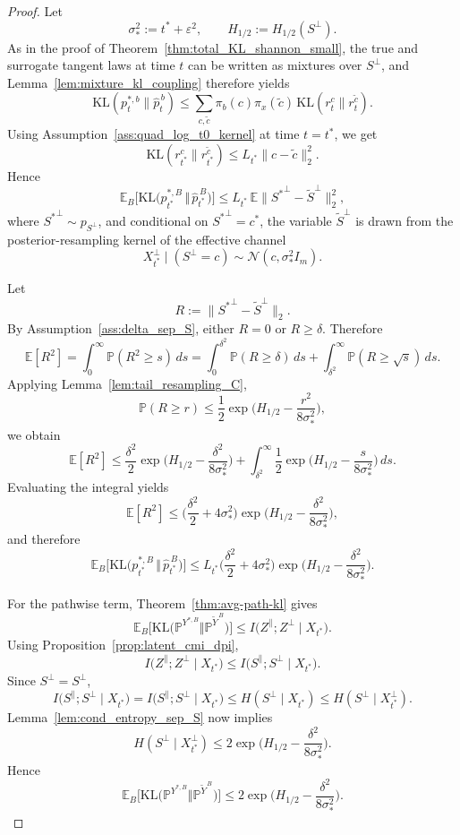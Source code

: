 \documentclass[twoside,11pt]{article}
\newcommand{\E}{\mathbb{E}}
\newcommand{\PP}{\mathbb{P}}
\newcommand{\Nc}{\mathcal{N}}
\newcommand{\KL}{\mathrm{KL}}
\numberwithin{equation}{section}
\begin{document}
\begin{proof}
Let
\[
\sigma_*^2:=t^*+\varepsilon^2,
\qquad
H_{1/2}:=H_{1/2}(S^\perp).
\]
As in the proof of Theorem~\ref{thm:total_KL_shannon_small}, the true and surrogate tangent
laws at time \(t\) can be written as mixtures over \(S^\perp\), and Lemma~\ref{lem:mixture_kl_coupling}
therefore yields
\[
\KL(p_t^{*,b}\|\hat p_t^{\,b})
\le
\sum_{c,\tilde c}\pi_b(c)\pi_x(\tilde c)\,\KL(r_t^c\|r_t^{\tilde c}).
\]
Using Assumption~\ref{ass:quad_log_t0_kernel} at time \(t=t^*\), we get
\[
\KL(r_{t^*}^c\|r_{t^*}^{\tilde c})
\le
L_{t^*}\|c-\tilde c\|_2^2.
\]
Hence
\[
\E_B\!\Big[\KL\!\big(p_{t^*}^{*,B}\,\Vert\,\hat p_{t^*}^{\,B}\big)\Big]
\le
L_{t^*}\,\E\|{S^*}^{\perp}-\tilde S^\perp\|_2^2,
\]
where \({S^*}^{\perp}\sim p_{S^\perp}\), and conditional on \({S^*}^{\perp}=c^*\), the variable
\(\tilde S^\perp\) is drawn from the posterior-resampling kernel of the effective channel
\[
X_{t^*}^\perp\mid(S^\perp=c)\sim\Nc(c,\sigma_*^2I_m).
\]

Let
\[
R:=\|{S^*}^{\perp}-\tilde S^\perp\|_2.
\]
By Assumption~\ref{ass:delta_sep_S}, either \(R=0\) or \(R\ge \delta\). Therefore
\[
\E[R^2]
=
\int_0^\infty \PP(R^2\ge s)\,ds
=
\int_0^{\delta^2}\PP(R\ge\delta)\,ds
+
\int_{\delta^2}^\infty \PP(R\ge \sqrt{s})\,ds.
\]
Applying Lemma~\ref{lem:tail_resampling_C},
\[
\PP(R\ge r)
\le
\frac12\exp\!\Big(H_{1/2}-\frac{r^2}{8\sigma_*^2}\Big),
\]
we obtain
\[
\E[R^2]
\le
\frac{\delta^2}{2}\exp\!\Big(H_{1/2}-\frac{\delta^2}{8\sigma_*^2}\Big)
+
\int_{\delta^2}^{\infty}
\frac12\exp\!\Big(H_{1/2}-\frac{s}{8\sigma_*^2}\Big)\,ds.
\]
Evaluating the integral yields
\[
\E[R^2]
\le
\Big(\frac{\delta^2}{2}+4\sigma_*^2\Big)
\exp\!\Big(H_{1/2}-\frac{\delta^2}{8\sigma_*^2}\Big),
\]
and therefore
\[
\E_B\!\Big[\KL\!\big(p_{t^*}^{*,B}\,\Vert\,\hat p_{t^*}^{\,B}\big)\Big]
\le
L_{t^*}\Big(\frac{\delta^2}{2}+4\sigma_*^2\Big)
\exp\!\Big(H_{1/2}-\frac{\delta^2}{8\sigma_*^2}\Big).
\]

For the pathwise term, Theorem~\ref{thm:avg-path-kl} gives
\[
\E_B\!\Big[\KL\!\big(\PP^{Y^{*,B}}\Vert \PP^{\tilde Y^{\,B}}\big)\Big]
\le
I\!\big(Z^\parallel;Z^\perp\mid X_{t^*}\big).
\]
Using Proposition~\ref{prop:latent_cmi_dpi},
\[
I\!\big(Z^\parallel;Z^\perp\mid X_{t^*}\big)
\le
I\!\big(S^\parallel;S^\perp\mid X_{t^*}\big).
\]
Since \(S^\perp=S^\perp\),
\[
I\!\big(S^\parallel;S^\perp\mid X_{t^*}\big)
=
I\!\big(S^\parallel;S^\perp\mid X_{t^*}\big)
\le
H(S^\perp\mid X_{t^*})
\le
H(S^\perp\mid X_{t^*}^\perp).
\]
Lemma~\ref{lem:cond_entropy_sep_S} now implies
\[
H(S^\perp\mid X_{t^*}^\perp)
\le
2\exp\!\Big(H_{1/2}-\frac{\delta^2}{8\sigma_*^2}\Big).
\]
Hence
\[
\E_B\!\Big[\KL\!\big(\PP^{Y^{*,B}}\Vert \PP^{\tilde Y^{\,B}}\big)\Big]
\le
2\exp\!\Big(H_{1/2}-\frac{\delta^2}{8\sigma_*^2}\Big).
\]


\end{proof}
\end{document}

